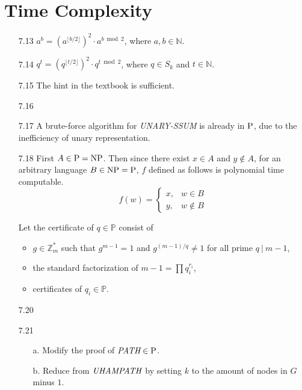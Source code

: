 \section{Time Complexity}

\begin{itemize}
	
	\item[7.13]
	$a^b = (a^{\lfloor b/2 \rfloor})^2 \cdot a^{b \bmod 2}$, where $a, b \in \mathbb{N}$.
	
	\item[7.14]
	$q^t = (q^{\lfloor t/2 \rfloor})^2 \cdot q^{t \bmod 2}$, where $q \in S_k$ and $t \in \mathbb{N}$.
	
	\item[7.15] 
	The hint in the textbook is sufficient.
	
	\item[7.16]
	\Omit
	
	\item[7.17]
	A brute-force algorithm for {\it UNARY-SSUM} is already in $\textrm{P}$, due to the inefficiency of unary representation.
	
	\item[7.18]
	First $A \in \textrm{P} = \textrm{NP}$. Then since there exist $x \in A$ and $y \notin A$, for an arbitrary language $B \in \textrm{NP} = \textrm{P}$, $f$ defined as follows is polynomial time computable.
	$$
		f(w) = 
		\left\{
			\begin{array}{ll}
				x, & w \in B \\
				y, & w \notin B
			\end{array}
		\right.
	$$
	
	\item[\Star 7.19]
	Let the certificate of $q \in \mathbb{P}$ consist of
	\begin{itemize}
		\item $g \in \mathbb{Z}_m^*$ such that $g^{m-1}=1$ and $g^{(m-1)/q} \neq 1$ for all prime $q \ | \ m-1$,
		\item the standard factorization of $m-1 = \prod q_i^{r_i}$,
		\item certificates of $q_i \in \mathbb{P}$.
	\end{itemize} 

	\item[7.20]
	\Error
	
	\item[7.21]
	\begin{itemize}
		\item[a.] Modify the proof of $\textit{PATH} \in \textrm{P}$.
		\item[b.] Reduce from $\textit{UHAMPATH}$ by setting $k$ to the amount of nodes in $G$ minus $1$.
	\end{itemize}


\end{itemize}

